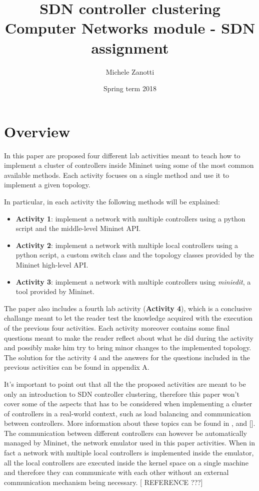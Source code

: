 \documentclass[12pt, a4paper]{article}
\title{SDN controller clustering \\ \large Computer Networks module - SDN assignment}
\author{Michele Zanotti}
\date{Spring term 2018}
\begin{document}
\maketitle
\newpage

\section*{Overview}
In this paper are proposed four different lab activities meant to teach how to implement
a cluster of controllers inside Mininet using some of the most common available methods.
Each activity focuses on a single method and use it to implement a given topology.

In particular, in each activity the following methods will be explained:
\begin{itemize}
  \item \textbf{Activity 1}: implement a network with multiple controllers using a python
  script and the middle-level Mininet API.
  \item \textbf{Activity 2}: implement a network with multiple local controllers using a python
  script, a custom switch class and the topology classes provided by the Mininet high-level API.
  \item \textbf{Activity 3}: implement a network with multiple controllers using
  \emph{miniedit}, a tool provided by Mininet.
\end{itemize}

The paper also includes a fourth lab activity (\textbf{Activity 4}), which is a conclusive challange meant
to let the reader test the knowledge acquired with the execution of the previous
four activities. Each activity moreover contains some final questions meant to make the reader
reflect about what he did during the activity and possibly make him try to
bring minor changes to the implemented topology. The solution
for the activity 4 and the answers for the questions included in the previous activities
can be found in appendix A.

It's important to point out that all the the proposed activities are meant to be
only an introduction to SDN controller clustering, therefore this paper won't cover
some of the aspects that has to be considered when implementing a cluster of
controllers in a real-world context, such as load balancing and communication
between controllers. More information about these topics can be found in
\cite{ref-1}, \cite{ref-2} and [].
The communication between different controllers can however be automatically managed
by Mininet, the network emulator used in this paper activities. When in fact a
network with multiple local controllers is implemented inside the emulator, all
the local controllers are executed inside the kernel space on a single machine
and therefore they can communicate with each other without an external
communication mechanism being necessary. [ REFERENCE ???]
\end{document}
